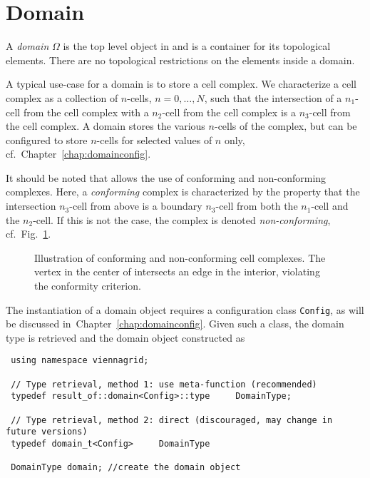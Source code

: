 \section{Domain}
A \emph{domain} $\Omega$ is the top level object in {\ViennaGrid} and is a container for its topological elements. There are no topological restrictions on the elements inside a domain. 

A typical use-case for a domain is to store a cell complex. We characterize a cell complex as a collection of $n$-cells, $n=0, \ldots, N$, such that the intersection of a $n_1$-cell from the cell complex with a $n_2$-cell from the cell complex is a $n_3$-cell from the cell complex. A domain stores the various $n$-cells of the complex, but can be configured to store $n$-cells for selected values of $n$ only, cf.~Chapter~\ref{chap:domainconfig}.

It should be noted that {\ViennaGrid} allows the use of conforming and non-conforming complexes. Here, a \emph{conforming} complex is characterized by the property that the intersection $n_3$-cell from above is a boundary $n_3$-cell from both the $n_1$-cell and the $n_2$-cell. If this is not the case, the complex is denoted \emph{non-conforming}, cf.~Fig.~\ref{fig:conformity}.

\begin{figure}[tb]
\centering 
    \hspace*{1cm}
 \caption{Illustration of conforming and non-conforming cell complexes. The vertex in the center of  intersects an edge in the interior, violating the conformity criterion.}
 \label{fig:conformity}
\end{figure}

The instantiation of a {\ViennaGrid} domain object requires a configuration class \lstinline|Config|, as will be discussed in~Chapter~\ref{chap:domainconfig}. Given such a class, the domain type is retrieved and the domain object constructed as 
\begin{lstlisting}
 using namespace viennagrid;

 // Type retrieval, method 1: use meta-function (recommended)
 typedef result_of::domain<Config>::type     DomainType;

 // Type retrieval, method 2: direct (discouraged, may change in future versions)
 typedef domain_t<Config>     DomainType

 DomainType domain; //create the domain object
\end{lstlisting}


